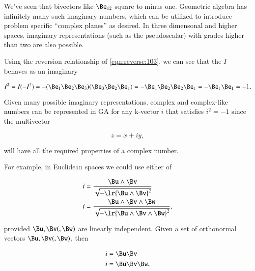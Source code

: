 %
%
We've seen that bivectors like \( \Be_{12} \) square to minus one.  Geometric algebra has infinitely many such imaginary numbers, which can be utilized to introduce problem specific ``complex planes'' as desired.  In three dimensonal and higher spaces, imaginary representations
(such as the  pseudoscalar) with grades higher than two are also possible.

Using the reversion relationship of \cref{eqn:reverse:103}, we can see that the \( I \) behaves as an imaginary

\begin{dmath}\label{eqn:R3PseudoscalarSquare:10}
I^2
=
I (-I^\dagger)
=
-
(\Be_1 \Be_2 \Be_3)(\Be_3 \Be_2 \Be_1)
=
-
\Be_1 \Be_2 \Be_2 \Be_1
=
-
\Be_1 \Be_1
=
-1.
\end{dmath}

Given many possible imaginary representations, complex and complex-like numbers can be represented in GA for any k-vector \( i \) that satisfies \( i^2 = -1 \) since the multivector

\begin{dmath}\label{eqn:complex:260}
z = x + i y,
\end{dmath}

will have all the required properties of a complex number.

For example, in Euclidean spaces we could use either of

\begin{dmath}\label{eqn:complex:280}
\begin{aligned}
i &= \frac{\Bu \wedge \Bv}{\sqrt{-\lr{\Bu\wedge\Bv}^2}} \\
i &= \frac{\Bu \wedge \Bv \wedge \Bw}{\sqrt{-\lr{\Bu\wedge\Bv\wedge \Bw}^2}},
\end{aligned}
\end{dmath}

provided \( \Bu, \Bv (,\Bw) \) are linearly independent.  Given a set of orthonormal vectors \( \Bu, \Bv (,\Bw) \), then

\begin{dmath}\label{eqn:complex:300}
\begin{aligned}
i &= \Bu \Bv \\
i &= \Bu \Bv \Bw,
\end{aligned}
\end{dmath}

